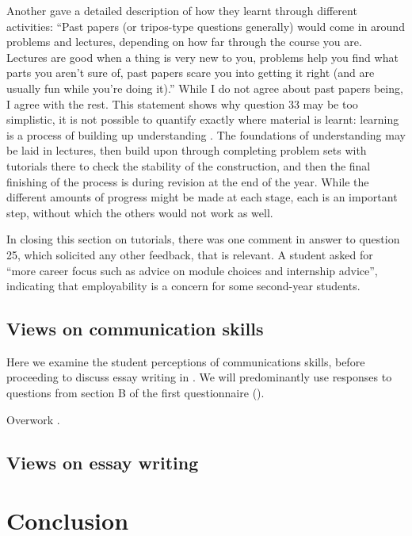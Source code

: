 Another gave a detailed description of how they learnt through different activities: ``Past papers (or tripos-type questions generally) would come in around problems and lectures, depending on how far through the course you are. Lectures are good when a thing is very new to you, problems help you find what parts you aren't sure of, past papers scare you into getting it right (and are usually fun while you're doing it).'' While I do not agree about past papers being, I agree with the rest. This statement shows why question 33 may be too simplistic, it is not possible to quantify exactly where material is learnt: learning is a process of building up understanding \citep[chapter 2]{Kolb1984}. The foundations of understanding may be laid in lectures, then build upon through completing problem sets with tutorials there to check the stability of the construction, and then the final finishing of the process is during revision at the end of the year. While the different amounts of progress might be made at each stage, each is an important step, without which the others would not work as well.

In closing this section on tutorials, there was one comment in answer to question 25, which solicited any other feedback, that is relevant. A student asked for ``more career focus such as advice on module choices and internship advice'', indicating that employability is a concern for some second-year students.

\subsection{Views on communication skills}\label{sec:comm-results}

Here we examine the student perceptions of communications skills, before proceeding to discuss essay writing in . We will predominantly use responses to questions from section B of the first questionnaire ().



Overwork .

\subsection{Views on essay writing}\label{sec:essay-results}

\section{Conclusion}\label{sec:student-conc}
